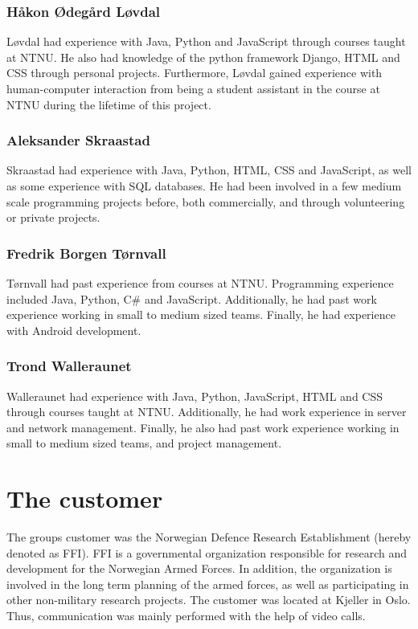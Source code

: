 \subsubsection{Håkon Ødegård Løvdal}

Løvdal had experience with Java, Python and JavaScript through courses taught at NTNU. He also had knowledge of the python framework Django, HTML and CSS through personal projects. Furthermore, Løvdal gained experience with human-computer interaction from being a student assistant in the course at NTNU during the lifetime of this project. 

\subsubsection{Aleksander Skraastad}

Skraastad had experience with Java, Python, HTML, CSS and JavaScript, as well as some experience with SQL databases. He had been involved in a few medium scale programming projects before, both commercially, and through volunteering or private projects.

\subsubsection{Fredrik Borgen Tørnvall}

Tørnvall had past experience from courses at NTNU. Programming experience included Java, Python, C\# and JavaScript. Additionally, he had past work experience working in small to medium sized teams. Finally, he had experience with Android development. 

\subsubsection{Trond Walleraunet}

Walleraunet had experience with Java, Python, JavaScript, HTML and CSS through courses taught at NTNU. Additionally, he had work experience in server and network management. Finally, he also had past work experience working in small to medium sized teams, and project management.


\section{The customer}
\label{sec:introduction-the_customer}

The groups customer was the Norwegian Defence Research Establishment (hereby denoted as FFI). FFI is a governmental organization responsible for research and development for the Norwegian Armed Forces. In addition, the organization is involved in the long term planning of the armed forces, as well as participating in other non-military research projects. The customer was located at Kjeller in Oslo. Thus, communication was mainly performed with the help of video calls.

